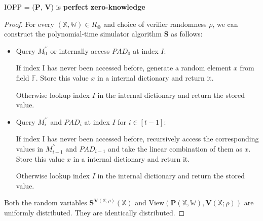 \begin{lemma}
\label{lemma:szkpc-zk}

IOPP = ($\textbf{P}$, $\textbf{V}$) is \textbf{perfect zero-knowledge}

\end{lemma}
\begin{proof}

For every $(\mathbb{X}, \mathbb{W}) \in R_\otimes$ and choice of verifier randomness $\rho$, we can construct the polynomial-time simulator algorithm $\textbf{S}$ as follows:

\begin{itemize}
    \item Query $M_0^{\prime\prime}$ or internally access $PAD_0$ at index $I$:
    
    If index I has never been accessed before, generate a random element $x$ from field $\mathbb{F}$. Store this value $x$ in a internal dictionary and return it.
    
    Otherwise lookup index $I$ in the internal dictionary and return the stored value.
    
    \item Query $M_i^{\prime\prime}$ and $PAD_i$ at index $I$ for $i \in [t-1]$:

    If index I has never been accessed before, recursively access the corresponding values in $M_{i-1}^{\prime\prime}$ and $PAD_{i-1}$ and take the linear combination of them as $x$.
    Store this value $x$ in a internal dictionary and return it.
    
    Otherwise lookup index $I$ in the internal dictionary and return the stored value.    
    
\end{itemize}

Both the random variables $\textbf{S}^{\textbf{V}(\mathbb{X};\rho)}(\mathbb{X})$ and $\text{View}(\textbf{P}(\mathbb{X}, \mathbb{W}), \textbf{V}(\mathbb{X};\rho))$ are uniformly distributed. They are identically distributed.

\end{proof}